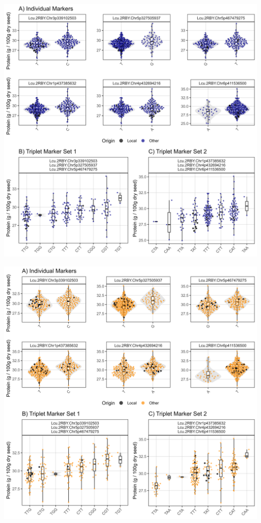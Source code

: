 \documentclass[
]{article}
\begin{document}
\includegraphics{Figure_05b.jpg}

\includegraphics{Figure_05c.jpg}
\end{document}

